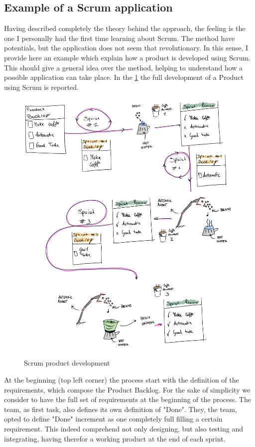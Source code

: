 \documentclass[../main.tex]{subfiles}
\begin{document}
\subsection{Example of a Scrum application}
Having described completely the theory behind the approach, the feeling is the one I personally had the first time learning about Scrum. The method have potentials, but the application does not seem that revolutionary. In this sense, I provide here an example which explain how a product is developed using Scrum. This should give a general idea over the method, helping to understand how a possible application can take place. In the \ref{fig:scrumprddev} the full development of a Product using Scrum is reported.
\begin{figure}[htp]
    \centering
    \includegraphics[width=\linewidth]{images_folder/scrum.png}
    \caption{Scrum product development}
    \label{fig:scrumprddev}
\end{figure}
At the beginning (top left corner) the process start with the definition of the requirements, which compose the Product Backlog. For the sake of simplicity we consider to have the full set of requirements at the beginning of the process. The team, as first task, also defines its own definition of "Done". They,  the team, opted to define "Done" increment as one completely full filling a certain requirement. This indeed comprehend not only designing, but also testing and integrating, having therefor a working product at the end of each sprint.\\
\end{document}
